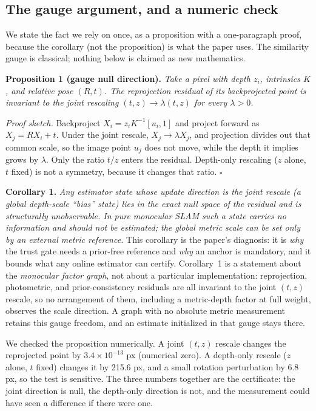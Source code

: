 \subsection{The gauge argument, and a numeric check}
\label{sec:gauge}

We state the fact we rely on once, as a proposition with a one-paragraph proof,
because the corollary (not the proposition) is what the paper uses. The
similarity gauge is classical; nothing below is claimed as new mathematics.

\medskip
\noindent\textbf{Proposition 1 (gauge null direction).} \emph{Take a pixel with
depth $z_i$, intrinsics $K$, and relative pose $(R,t)$. The reprojection residual
of its backprojected point is invariant to the joint rescaling
$(t,z)\to\lambda(t,z)$ for every $\lambda>0$.}

\smallskip
\noindent\emph{Proof sketch.} Backproject $X_i = z_i K^{-1}[u_i,1]$ and project
forward as $X_j = R X_i + t$. Under the joint rescale, $X_j \to \lambda X_j$, and
projection divides out that common scale, so the image point $u_j$ does not move,
while the depth it implies grows by $\lambda$. Only the ratio $t/z$ enters
the residual. Depth-only rescaling ($z$ alone, $t$ fixed) is not a symmetry,
because it changes that ratio. \hfill$\square$

\smallskip
\noindent\textbf{Corollary 1.} \emph{Any estimator state whose update direction is
the joint rescale (a global depth-scale ``bias'' state) lies in the exact
null space of the residual and is structurally unobservable. In pure monocular
SLAM such a state carries no information and should not be estimated; the global
metric scale can be set only by an external metric reference.} This corollary is
the paper's diagnosis: it is \emph{why} the trust gate needs a prior-free
reference and \emph{why} an anchor is mandatory, and it bounds what any online
estimator can certify. Corollary~1 is a statement about the \emph{monocular factor
graph}, not about a particular implementation: reprojection, photometric, and
prior-consistency residuals are all invariant to the joint $(t,z)$ rescale, so no
arrangement of them, including a metric-depth factor at full weight, observes
the scale direction. A graph with no absolute metric measurement retains this
gauge freedom, and an estimate initialized in that gauge stays there.

We checked the proposition numerically. A joint $(t,z)$ rescale changes the
reprojected point by $3.4\times10^{-13}$ px (numerical zero). A depth-only rescale
($z$ alone, $t$ fixed) changes it by 215.6 px, and a small rotation perturbation
by 6.8 px, so the test is sensitive. The three numbers together are the
certificate: the joint direction is null, the depth-only direction is not, and
the measurement could have seen a difference if there were one.

